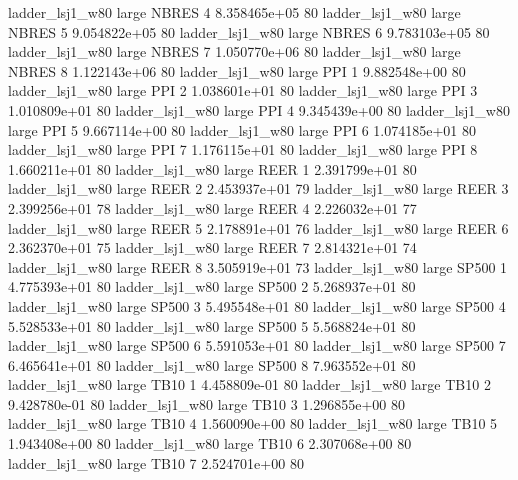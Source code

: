     ladder_lsj1_w80      large    NBRES                 4 8.358465e+05 80
    ladder_lsj1_w80      large    NBRES                 5 9.054822e+05 80
    ladder_lsj1_w80      large    NBRES                 6 9.783103e+05 80
    ladder_lsj1_w80      large    NBRES                 7 1.050770e+06 80
    ladder_lsj1_w80      large    NBRES                 8 1.122143e+06 80
    ladder_lsj1_w80      large      PPI                 1 9.882548e+00 80
    ladder_lsj1_w80      large      PPI                 2 1.038601e+01 80
    ladder_lsj1_w80      large      PPI                 3 1.010809e+01 80
    ladder_lsj1_w80      large      PPI                 4 9.345439e+00 80
    ladder_lsj1_w80      large      PPI                 5 9.667114e+00 80
    ladder_lsj1_w80      large      PPI                 6 1.074185e+01 80
    ladder_lsj1_w80      large      PPI                 7 1.176115e+01 80
    ladder_lsj1_w80      large      PPI                 8 1.660211e+01 80
    ladder_lsj1_w80      large     REER                 1 2.391799e+01 80
    ladder_lsj1_w80      large     REER                 2 2.453937e+01 79
    ladder_lsj1_w80      large     REER                 3 2.399256e+01 78
    ladder_lsj1_w80      large     REER                 4 2.226032e+01 77
    ladder_lsj1_w80      large     REER                 5 2.178891e+01 76
    ladder_lsj1_w80      large     REER                 6 2.362370e+01 75
    ladder_lsj1_w80      large     REER                 7 2.814321e+01 74
    ladder_lsj1_w80      large     REER                 8 3.505919e+01 73
    ladder_lsj1_w80      large    SP500                 1 4.775393e+01 80
    ladder_lsj1_w80      large    SP500                 2 5.268937e+01 80
    ladder_lsj1_w80      large    SP500                 3 5.495548e+01 80
    ladder_lsj1_w80      large    SP500                 4 5.528533e+01 80
    ladder_lsj1_w80      large    SP500                 5 5.568824e+01 80
    ladder_lsj1_w80      large    SP500                 6 5.591053e+01 80
    ladder_lsj1_w80      large    SP500                 7 6.465641e+01 80
    ladder_lsj1_w80      large    SP500                 8 7.963552e+01 80
    ladder_lsj1_w80      large     TB10                 1 4.458809e-01 80
    ladder_lsj1_w80      large     TB10                 2 9.428780e-01 80
    ladder_lsj1_w80      large     TB10                 3 1.296855e+00 80
    ladder_lsj1_w80      large     TB10                 4 1.560090e+00 80
    ladder_lsj1_w80      large     TB10                 5 1.943408e+00 80
    ladder_lsj1_w80      large     TB10                 6 2.307068e+00 80
    ladder_lsj1_w80      large     TB10                 7 2.524701e+00 80
